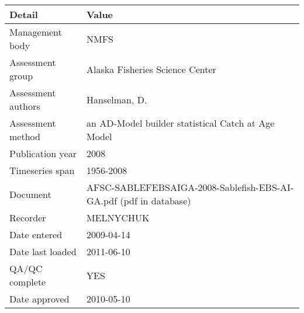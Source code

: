 \begin{table}[htb]
\centering
\begin{tabular}{lp{7cm}}
\toprule
Detail & Value \\
\midrule
Management body    & NMFS                                                              \\
Assessment group   & Alaska Fisheries Science Center                                   \\
Assessment authors & Hanselman, D.                                                     \\
Assessment method  & an AD-Model builder statistical Catch at Age Model                \\
Publication year   & 2008                                                              \\
Timeseries span    & 1956-2008                                                         \\
Document           & AFSC-SABLEFEBSAIGA-2008-Sablefish-EBS-AI-GA.pdf (pdf in database) \\
Recorder           & MELNYCHUK                                                         \\
Date entered       & 2009-04-14                                                        \\
Date last loaded   & 2011-06-10                                                        \\
QA/QC complete     & YES                                                               \\
Date approved      & 2010-05-10                                                        \\
\bottomrule
\end{tabular}
\label{tab:assessdet}
\end{table}
